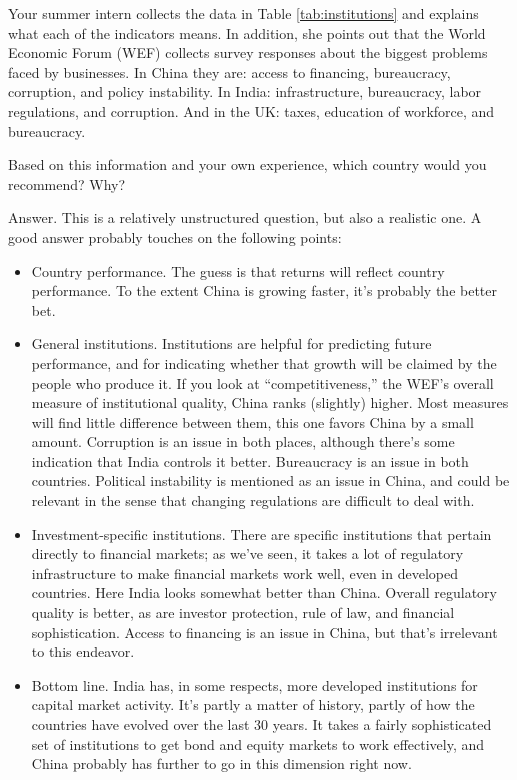 \begin{enumerate}
Your summer intern collects the data in Table \ref{tab:institutions}
and explains what each of the indicators means.
In addition, she points out that
the World Economic Forum (WEF) collects survey responses about
the biggest problems faced by businesses.
In China they are:  access to financing, bureaucracy, corruption, and policy instability.
In India:  infrastructure, bureaucracy, labor regulations, and corruption. And in the UK:  taxes, education of workforce, and bureaucracy.

Based on this information and your own experience,
which country would you recommend? Why?

Answer.  
This is a relatively unstructured question,  but also a realistic one.  
A good answer probably touches on the following points:
%
\begin{itemize}
\item Country performance.
The guess is that returns will reflect country performance.
To the extent China is growing faster,
it's probably the better bet.

\item General institutions.
Institutions are helpful for predicting future performance,
and for indicating whether that growth will be claimed
by the people who produce it.
If you look at ``competitiveness,'' the WEF's overall measure of
institutional quality, China ranks (slightly) higher.
Most measures will find little difference between them,
this one favors China by a small amount.
Corruption is an issue in both places, although there's
some indication that India controls it better.
Bureaucracy is an issue in both countries.
Political instability is mentioned as an issue in China,
and could be relevant in the sense that changing regulations
are difficult to deal with.

\item Investment-specific institutions.
There are specific institutions that pertain directly to financial
markets; as we've seen, it takes a lot of regulatory infrastructure
to make financial markets work well, even in developed countries.
Here India looks somewhat better than China.
Overall regulatory quality is better,
as are investor protection, rule of law, and financial sophistication. Access to financing is an issue in China,
but that's irrelevant to this endeavor.

\item Bottom line.  
India has, in some respects, more developed
institutions for capital market activity.
It's partly a matter of history, partly of how the countries
have evolved over the last 30 years.
It takes a fairly sophisticated set of institutions to get
bond and equity markets to work effectively,
and China probably has further to go in this dimension right now.
\end{itemize}


\end{enumerate}
\setlength{\leftmargini}{\oldleftmargini}


